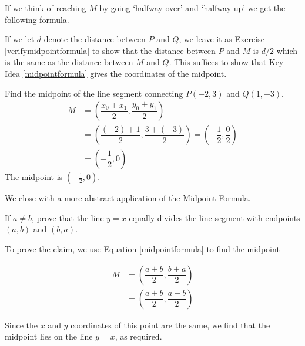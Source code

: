 If we think of reaching $M$ by going `halfway over' and `halfway up' we get the following formula. 

\medskip


\medskip

If we let $d$ denote the distance between $P$ and $Q$, we leave it as Exercise \ref{verifymidpointformula} to show that the distance between $P$ and $M$ is $d/2$ which is the same as the distance between $M$ and $Q$.  This suffices to show that Key Idea \ref{midpointformula} gives the coordinates of the midpoint.

\medskip

{
Find the midpoint of the line segment connecting $P(-2,3)$ and  $Q(1,-3)$.  
}
{
\begin{align*}
 M & = \left( \dfrac{x_{0}+x_{1}}{2},  \dfrac{y_{0}+y_{1}}{2} \right) \\
   & = \left( \dfrac{(-2)+1}{2},  \dfrac{3+(-3)}{2} \right)  = \left(- \dfrac{1}{2}, \dfrac{0}{2} \right) \\
   & = \left(- \dfrac{1}{2}, 0 \right) 
\end{align*}
The midpoint is  $\left(- \frac{1}{2}, 0 \right)$.}

\medskip


\label{inversemidpoint}

We close with a more abstract application of the Midpoint Formula.  

\medskip

{
If $a \neq b$, prove that the line $y = x$ equally divides the line segment with endpoints $(a,b)$ and $(b,a)$.
}
{
To prove the claim, we use Equation \ref{midpointformula} to find the midpoint  


\begin{align*}
 M & =  \left( \dfrac{a+b}{2},  \dfrac{b+a}{2} \right) \\
   & =  \left( \dfrac{a+b}{2},  \dfrac{a+b}{2} \right)
\end{align*}

Since the $x$ and $y$ coordinates of this point are the same, we find that the midpoint lies on the line $y=x$, as required. 
}

{}
